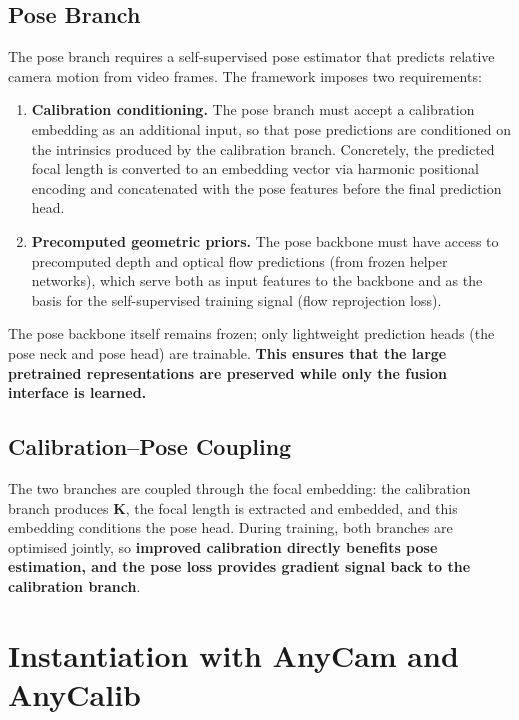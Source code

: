 \subsection{Pose Branch}\label{sec:pose-branch-generic}

The pose branch requires a self-supervised pose estimator that predicts relative camera motion from video frames. The framework imposes two requirements:

\begin{enumerate}
    \item \textbf{Calibration conditioning.} The pose branch must accept a calibration embedding as an additional input, so that pose predictions are conditioned on the intrinsics produced by the calibration branch. Concretely, the predicted focal length is converted to an embedding vector via harmonic positional encoding and concatenated with the pose features before the final prediction head.

    \item \textbf{Precomputed geometric priors.} The pose backbone must have access to precomputed depth and optical flow predictions (from frozen helper networks), which serve both as input features to the backbone and as the basis for the self-supervised training signal (flow reprojection loss).
\end{enumerate}

The pose backbone itself remains frozen; only lightweight prediction heads (the pose neck and pose head) are trainable. \textbf{This ensures that the large pretrained representations are preserved while only the fusion interface is learned.}

\subsection{Calibration--Pose Coupling}\label{sec:fusion}

The two branches are coupled through the focal embedding: the calibration branch produces $\mathbf{K}$, the focal length is extracted and embedded, and this embedding conditions the pose head. During training, both branches are optimised jointly, so \textbf{improved calibration directly benefits pose estimation, and the pose loss provides gradient signal back to the calibration branch}.


\section{Instantiation with AnyCam and AnyCalib}\label{sec:instantiation}

